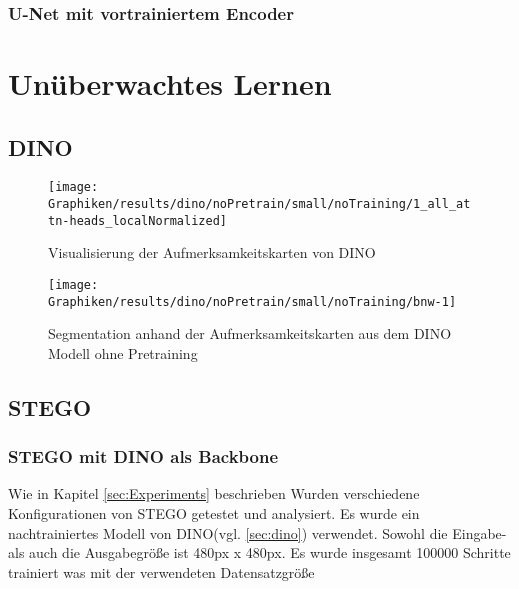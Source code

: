 \subsubsection{U-Net mit vortrainiertem Encoder}

\section{Unüberwachtes Lernen}
	\label{sec:results_unsupervised}
	\subsection{DINO}
    
    
    \begin{figure}[h!]
    	\centering
    	\texttt{[image: Graphiken/results/dino/noPretrain/small/noTraining/1\_all\_attn-heads\_localNormalized]}
    	\caption{Visualisierung der Aufmerksamkeitskarten von DINO}
    	\label{fig:dino_1allattn-headslocalnormalized}
    \end{figure}
    
    
    \begin{figure}[h!]
    	\centering
    	\texttt{[image: Graphiken/results/dino/noPretrain/small/noTraining/bnw-1]}
    	\caption{Segmentation anhand der Aufmerksamkeitskarten aus dem DINO Modell ohne Pretraining}
    	\label{fig:dino_bnw-1}
    \end{figure}
    
 	\subsection{STEGO}

    \subsubsection{STEGO mit DINO als Backbone}
    Wie in Kapitel \ref{sec:Experiments} beschrieben Wurden verschiedene Konfigurationen von STEGO getestet und analysiert.
    Es wurde ein nachtrainiertes Modell von DINO(vgl. \ref{sec:dino}) verwendet. Sowohl die Eingabe- als auch die Ausgabegröße ist 480px x 480px. Es wurde insgesamt 100000 Schritte trainiert was mit der verwendeten Datensatzgröße  
    










